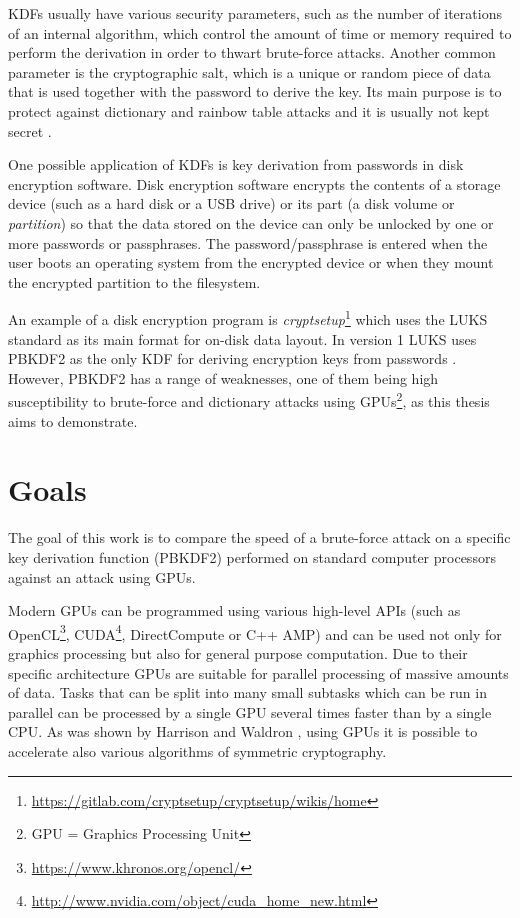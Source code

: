 \documentclass[12pt,oneside]{fithesis2}
\begin{document}
      KDFs usually have various security parameters, such as the number of iterations of an internal algorithm, which control the amount of time or memory required to perform the derivation in order to thwart brute-force attacks. Another common parameter is the cryptographic salt, which is a unique or random piece of data that is used together with the password to derive the key. Its main purpose is to protect against dictionary and rainbow table attacks and it is usually not kept secret \cite{rfc2898}.
      
      \sloppy
      One possible application of KDFs is key derivation from passwords in disk encryption software. Disk encryption software encrypts the contents of a storage device (such as a hard disk or a USB drive) or its part (a disk volume or \emph{partition}) so that the data stored on the device can only be unlocked by one or more passwords or passphrases. The password/passphrase is entered when the user boots an operating system from the encrypted device or when they mount the encrypted partition to the filesystem.
      
      An example of a disk encryption program is \emph{cryptsetup}\footnote{\url{https://gitlab.com/cryptsetup/cryptsetup/wikis/home}} which uses the LUKS standard as its main format for on-disk data layout. In version 1 LUKS uses PBKDF2 as the only KDF for deriving encryption keys from passwords \cite{luks}. However, PBKDF2 has a range of weaknesses, one of them being high susceptibility to brute-force and dictionary attacks using GPUs\footnote{GPU = Graphics Processing Unit}, as this thesis aims to demonstrate.
    
      \section{Goals}
      The goal of this work is to compare the speed of a brute-force attack on a specific key derivation function (PBKDF2) performed on standard computer processors against an attack using GPUs.
      
      Modern GPUs can be programmed using various high-level APIs (such as OpenCL\footnote{\url{https://www.khronos.org/opencl/}}, CUDA\footnote{\url{http://www.nvidia.com/object/cuda_home_new.html}}, DirectCompute or C++ AMP) and can be used not only for graphics processing but also for general purpose computation. Due to their specific architecture GPUs are suitable for parallel processing of massive amounts of data. Tasks that can be split into many small subtasks which can be run in parallel can be processed by a single GPU several times faster than by a single CPU. As was shown by Harrison and Waldron \cite{Harrison}, using GPUs it is possible to accelerate also various algorithms of symmetric cryptography.
    
\end{document}
